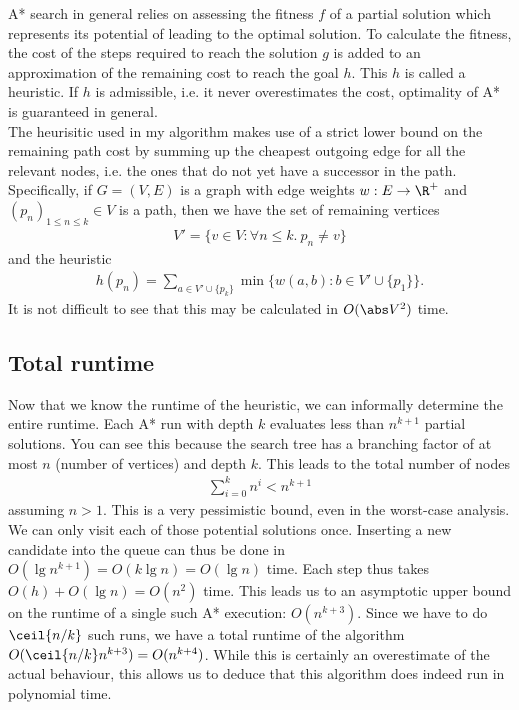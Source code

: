 \documentclass{article}
\begin{document}
A* search in general relies on assessing the fitness $f$ of a partial solution
which represents its potential of leading to the optimal solution. To calculate the
fitness, the cost of the steps required to reach the solution $g$ is added to an approximation
of the remaining cost to reach the goal $h$. This $h$ is called a heuristic.
If $h$ is admissible, i.e. it never overestimates the cost, optimality of A* is
guaranteed in general.\\
The heurisitic used in my algorithm makes use of a strict lower bound on the remaining
path cost by summing up the cheapest outgoing edge for all the relevant nodes, i.e.
the ones that do not yet have a successor in the path. Specifically, if $G=(V,E)$ is
a graph with edge weights $w:E\to\R^+$
and $(p_n)_{1\leq n\leq k}\in V$ is a path, then we have the set of remaining vertices
\begin{align*}
	V'=\{v\in V : \forall n \leq k.\: p_n \not= v\}
\end{align*}
and the heuristic
\begin{align*}
	h(p_n) = \sum_{a\in V'\cup\{p_k\}} \min\{w(a, b) : b\in V'\cup\{p_1\}\}.
\end{align*}
It is not difficult to see that this may be calculated in $O(\abs V^2)$ time.

\subsection{Total runtime}

Now that we know the runtime of the heuristic, we can informally determine the entire
runtime. Each A* run with depth $k$ evaluates less than $n^{k+1}$ partial solutions.
You can see this because the search tree has a branching factor of at most $n$ (number
of vertices) and depth $k$. This leads to the total number of nodes
\begin{align*}
	\sum_{i=0}^k n^i < n^{k+1}
\end{align*}
assuming $n>1$. This is a very pessimistic bound, even in the worst-case
analysis. We can only visit each of those potential solutions once.
Inserting a new candidate into the queue can thus be done in $O(\lg n^{k+1})
	= O(k\lg n)=O(\lg n)$ time. Each step thus takes $O(h)+O(\lg n)=O(n^2)$ time.
This leads us to an asymptotic upper bound on the runtime of a single
such A* execution: $O(n^{k+3})$. Since we have to do $\ceil{n/k}$ such
runs, we have a total runtime of the algorithm $O(\ceil{n/k}n^{k+3})=
	O(n^{k+4})$. While this is certainly an overestimate of the actual behaviour,
this allows us to deduce that this algorithm does indeed run in
polynomial time.
\end{document}
